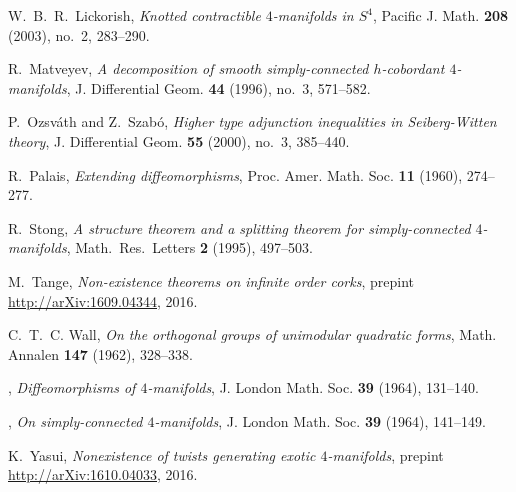 \documentclass[11pt]{amsart}
\theoremstyle{definition}
\begin{document}
\begin{thebibliography}{10}
W.~B.~R.~Lickorish, \emph{Knotted contractible $4$-manifolds in $S^4$}, Pacific J. Math. \textbf{208} (2003), no.~2, 283--290.

R.~Matveyev, \emph{A decomposition of smooth simply-connected
  {$h$}-cobordant {$4$}-manifolds}, J. Differential Geom. \textbf{44} (1996),
  no.~3, 571--582. %

P.~Ozsv\'ath and Z.~Szab\'o, \emph{Higher type adjunction inequalities in Seiberg-Witten theory}, J. Differential Geom. \textbf{55} (2000),
  no.~3, 385--440. 

R.~Palais, \emph{Extending diffeomorphisms}, Proc. Amer. Math. Soc. \textbf{11} (1960), 274--277.

R.~Stong, \emph{A structure theorem and a splitting theorem for simply-connected $4$-manifolds}, Math.\ Res.\ Letters \textbf{2} (1995), 497--503.

M.~Tange,
{\em Non-existence theorems on infinite order corks}, prepint
\newblock \url{http://arXiv:1609.04344}, 2016.

C.~T.~C. Wall, \emph{On the orthogonal groups of unimodular quadratic forms}, Math. Annalen \textbf{147} (1962), 328--338. 

\bysame, \emph{Diffeomorphisms of {$4$}-manifolds}, J. London Math. Soc. \textbf{39} (1964), 131--140. %

\bysame, \emph{On simply-connected {$4$}-manifolds}, J. London Math. Soc. \textbf{39} (1964), 141--149. %

K.~Yasui,
{\em Nonexistence of twists generating exotic $4$-manifolds}, prepint
\newblock \url{http://arXiv:1610.04033}, 2016.


\end{thebibliography}

 
\end{document}
